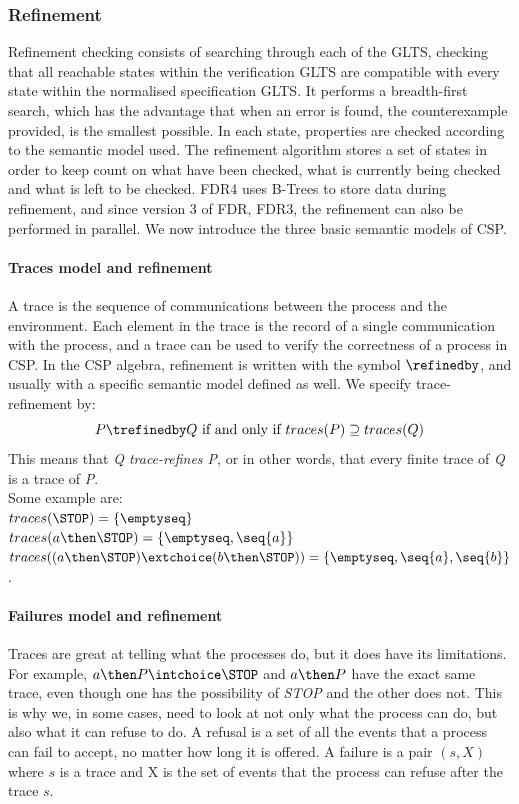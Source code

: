 \subsubsection{Refinement}
\label{sec:refinement}
Refinement checking consists of searching through each of the GLTS, checking that all reachable states within the verification GLTS are compatible with every state within the normalised specification GLTS. It performs a breadth-first search, which has the advantage that when an error is found, the counterexample provided, is the smallest possible. In each state, properties are checked according to the semantic model used. The refinement algorithm stores a set of states in order to keep count on what have been checked, what is currently being checked and what is left to be checked. FDR4 uses B-Trees to store data during refinement, and since version 3 of FDR, FDR3, the refinement can also be performed in parallel.
We now introduce the three basic semantic models of CSP.
\paragraph{Traces model and refinement}
A trace is the sequence of communications between the process and the environment. Each element in the trace is the record of a single communication with the process, and a trace can be used to verify the correctness of a process in CSP. In the CSP algebra, refinement is written with the symbol $\refinedby$, and usually with a specific semantic model defined as well. We specify trace-refinement by: \\
$$P \trefinedby Q \text{ if and only if } traces(P) \supseteq traces(Q)$$
This means that \textit{Q trace-refines P}, or in other words, that every finite trace of \textit{Q} is a trace of \textit{P}. \\
Some example are:\\
$traces(\STOP) = \{\emptyseq\}$\\
$traces(a \then \STOP) = \{\emptyseq, \seq{a}\}$\\
$traces((a \then \STOP)\extchoice (b \then \STOP)) = \{\emptyseq, \seq{a}, \seq{b}\}$.
\paragraph{Failures model and refinement}
Traces are great at telling what the processes do, but it does have its limitations. For example, $a \then P \intchoice \STOP$ and $a \then P$ have the exact same trace, even though one has the possibility of \textit{STOP} and the other does not. This is why we, in some cases, need to look at not only what the process can do, but also what it can refuse to do. A refusal is a set of all the events that a process can fail to accept, no matter how long it is offered. A failure is a pair $(s, X)$ where $s$ is a trace and X is the set of events that the process can refuse after the trace $s$.

